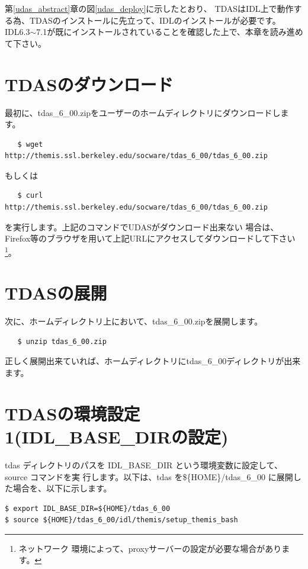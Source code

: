 \documentclass[a4j]{jbook}
\begin{document}
第\ref{udas_abstract}章の図\ref{udas_deploy}に示したとおり、
TDASはIDL上で動作する為、TDASのインストールに先立って、IDLのインストールが必要です。
IDL6.3$\sim$7.1が既にインストールされていることを確認した上で、本章を読み進めて下さい。

\section{TDASのダウンロード}
最初に、tdas\_6\_00.zipをユーザーのホームディレクトリにダウンロードします。
\begin{screen}
\begin{verbatim}
   $ wget http://themis.ssl.berkeley.edu/socware/tdas_6_00/tdas_6_00.zip
\end{verbatim}
\end{screen}
もしくは
\begin{screen}
\begin{verbatim}
   $ curl http://themis.ssl.berkeley.edu/socware/tdas_6_00/tdas_6_00.zip 
\end{verbatim}
\end{screen}
を実行します。上記のコマンドでUDASがダウンロード出来ない
場合は、Firefox等のブラウザを用いて上記URLにアクセスしてダウンロードして下さい\footnote{ネットワーク
環境によって、proxyサーバーの設定が必要な場合があります。}。
\section{TDASの展開}
次に、ホームディレクトリ上において、tdas\_6\_00.zipを展開します。
\begin{screen}
\begin{verbatim}
   $ unzip tdas_6_00.zip
\end{verbatim}
\end{screen}
正しく展開出来ていれば、ホームディレクトリにtdas\_6\_00ディレクトリが出来ます。

\section{TDASの環境設定1(IDL\_BASE\_DIRの設定)}
tdas ディレクトリのパスを IDL\_BASE\_DIR という環境変数に設定して、source  コマンドを実
行します。以下は、tdas を\$\{HOME\}/tdas\_6\_00 に展開した場合を、以下に示します。
\begin{screen}
\begin{verbatim}
$ export IDL_BASE_DIR=${HOME}/tdas_6_00
$ source ${HOME}/tdas_6_00/idl/themis/setup_themis_bash
\end{verbatim}
\end{screen}
\end{document}

